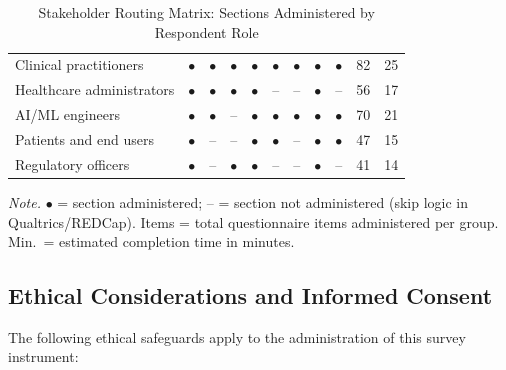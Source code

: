 {\tablestripes\tablefontsize
{}
\begin{xltabular}{\textwidth}{@{} L c c c c c c c c r r @{}}
\caption[Stakeholder Routing Matrix]{Stakeholder Routing Matrix: Sections Administered by Respondent Role}\label{tab:survey_routing} \\
\toprule
{} &  &  &  &  &  &  &  &  &  &  \\
\midrule
\endfirsthead
\endhead
\bottomrule
\endlastfoot
Clinical practitioners & $\bullet$ & $\bullet$ & $\bullet$ & $\bullet$ & $\bullet$ & $\bullet$ & $\bullet$ & $\bullet$ & 82 & 25 \\
Healthcare administrators & $\bullet$ & $\bullet$ & $\bullet$ & $\bullet$ & -- & -- & $\bullet$ & -- & 56 & 17 \\
AI/ML engineers & $\bullet$ & $\bullet$ & -- & $\bullet$ & $\bullet$ & $\bullet$ & $\bullet$ & $\bullet$ & 70 & 21 \\
Patients and end users & $\bullet$ & -- & -- & $\bullet$ & $\bullet$ & -- & $\bullet$ & $\bullet$ & 47 & 15 \\
Regulatory officers & $\bullet$ & -- & $\bullet$ & $\bullet$ & -- & -- & $\bullet$ & -- & 41 & 14 \\
\end{xltabular}}
\vspace{0.5em}\noindent\textit{Note.} $\bullet$ = section administered; -- = section not administered (skip logic in Qualtrics/REDCap). Items = total questionnaire items administered per group. Min.\ = estimated completion time in minutes.

\subsection{Ethical Considerations and Informed Consent}
\label{subsec:survey_ethics}

The following ethical safeguards apply to the administration of this survey instrument:

